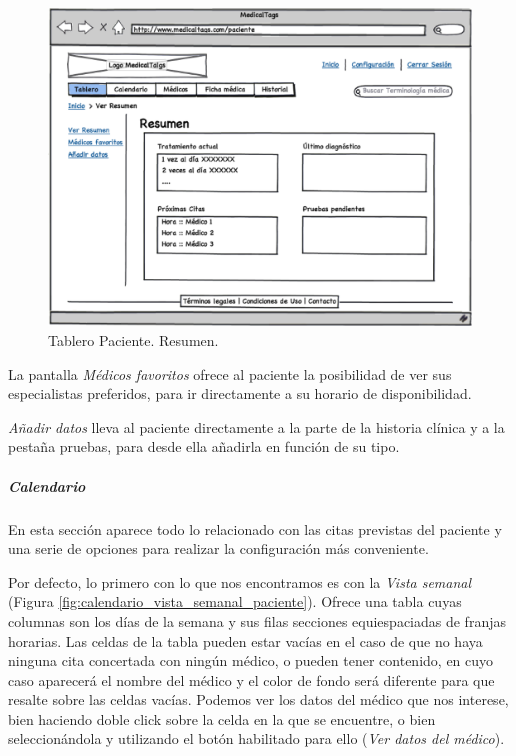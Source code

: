 \documentclass[a4paper,oneside,11pt]{book}
\begin{document}
		\begin{figure}[H]
		  \centering
		    \includegraphics[width=12cm]{img/eps/26_Tablero_Paciente1.eps}
		  \caption{Tablero Paciente. Resumen.}
		  \label{fig:tablero_paciente_resumen}
		\end{figure}
		
		La pantalla \textit{Médicos favoritos} ofrece al paciente la posibilidad de ver sus especialistas preferidos, para ir directamente a su horario de disponibilidad.	
		
		\textit{Añadir datos} lleva al paciente directamente a la parte de la historia clínica y a la pestaña pruebas, para desde ella añadirla en función de su tipo.
		
		
		
		\subparagraph{Calendario} %
		\label{par:paciente_calendario}
		
		En esta sección aparece todo lo relacionado con las citas previstas del paciente y una serie de opciones para realizar la configuración  más conveniente.
		
		Por defecto, lo primero con lo que nos encontramos es con la \textit{Vista semanal} (Figura \ref{fig:calendario_vista_semanal_paciente}). Ofrece una tabla cuyas columnas son los días de la semana y sus filas secciones equiespaciadas de franjas horarias. Las celdas de la tabla pueden estar vacías en el caso de que no haya ninguna cita concertada con ningún médico, o pueden tener contenido, en cuyo caso aparecerá el nombre del médico y el color de fondo será diferente para que resalte sobre las celdas vacías. Podemos ver los datos del médico que nos interese, bien haciendo doble click sobre la celda en la que se encuentre, o bien seleccionándola y utilizando el botón habilitado para ello (\textit{Ver datos del médico}). 
		
\end{document}

